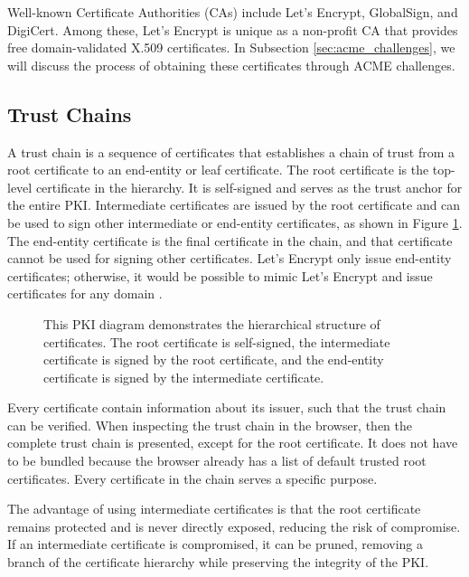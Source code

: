 Well-known Certificate Authorities (CAs) include Let's Encrypt, GlobalSign, and DigiCert. Among these, Let's Encrypt is unique as a non-profit CA that provides free domain-validated X.509 certificates. In Subsection \ref{sec:acme_challenges}, we will discuss the process of obtaining these certificates through ACME challenges.

\subsection{Trust Chains} \label{sec:trust_chains}
A trust chain is a sequence of certificates that establishes a chain of trust from a root certificate to an end-entity or leaf certificate. The root certificate is the top-level certificate in the hierarchy. It is self-signed and serves as the trust anchor for the entire PKI. Intermediate certificates are issued by the root certificate and can be used to sign other intermediate or end-entity certificates, as shown in Figure \ref{fig:pki_diagram}. The end-entity certificate is the final certificate in the chain, and that certificate cannot be used for signing other certificates. Let's Encrypt only issue end-entity certificates; otherwise, it would be possible to mimic Let's Encrypt and issue certificates for any domain \Parencite{letsencrypt_certificates}.

\begin{figure}[h]
    \centering
    
    \caption{This PKI diagram demonstrates the hierarchical structure of certificates. The root certificate is self-signed, the intermediate certificate is signed by the root certificate, and the end-entity certificate is signed by the intermediate certificate.}
    \label{fig:pki_diagram}
\end{figure}

Every certificate contain information about its issuer, such that the trust chain can be verified. When inspecting the trust chain in the browser, then the complete trust chain is presented, except for the root certificate. It does not have to be bundled because the browser already has a list of default trusted root certificates. Every certificate in the chain serves a specific purpose.

The advantage of using intermediate certificates is that the root certificate remains protected and is never directly exposed, reducing the risk of compromise. If an intermediate certificate is compromised, it can be pruned, removing a branch of the certificate hierarchy while preserving the integrity of the PKI.

